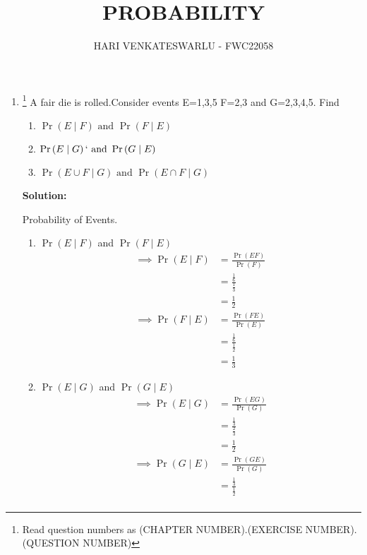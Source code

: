 \documentclass{article}
\providecommand{\pr}[1]{\ensuremath{\Pr\left(#1\right)}}
\newcommand{\solution}{\noindent \textbf{Solution: }}
\providecommand{\pr}[1]{\ensuremath{\Pr\left(#1\right)}}
\begin{document}
\title{PROBABILITY}
\author{\Large HARI VENKATESWARLU - FWC22058}
\date{}

\maketitle

\begin{enumerate}[label=13.\arabic{enumi}.\arabic{enumii}]%
\setcounter{enumi}{0}
\setcounter{enumii}{11}

\item \footnote{Read question numbers as (CHAPTER NUMBER).(EXERCISE NUMBER).(QUESTION NUMBER)} {A fair die is rolled.Consider events E=1,3,5 F=2,3 and G=2,3,4,5. Find}
\begin{enumerate}
\item $\pr{E \mid F} \text{ and } \pr{F \mid E}$
\item $\pr{E \mid G} `\text{ and } \pr{G \mid E}$
\item $\pr{{E \cup F} \mid G} \text{ and } \pr{{E \cap F} \mid G}$
\end{enumerate}
	\solution\\
	\begin{table}[h]\centering
	
	\caption{Probability of Events.}
	\label{table1:}
\end{table}
\begin{enumerate}
\item $\pr{E \mid F}$ and $\pr{F \mid E}$
\begin{align}
\implies\pr{E \mid F} &= \frac{\pr{EF}}{\pr{F}}\\
&=\frac{\frac{1}{6}}{\frac{1}{3}}\\
&=\frac{1}{2}\\
\implies\pr{F \mid E} &= \frac{\pr{FE}}{\pr{E}}\\
&= \frac{\frac{1}{6}}{\frac{1}{2}}\\
&=\frac{1}{3}
\end{align}
\item $\pr{E \mid G}$ and $\pr{G \mid E}$
\begin{align}
\implies\pr{E \mid G} &= \frac{\pr{EG}}{\pr{G}}\\
&=\frac{\frac{1}{3}}{\frac{2}{3}}\\
&=\frac{1}{2}\\
\implies \pr{G \mid E} &= \frac{\pr{GE}}{\pr{G}}\\
&=\frac{\frac{1}{3}}{\frac{1}{2}}\\

\end{align}
\end{enumerate}
\end{enumerate}
\end{document}
